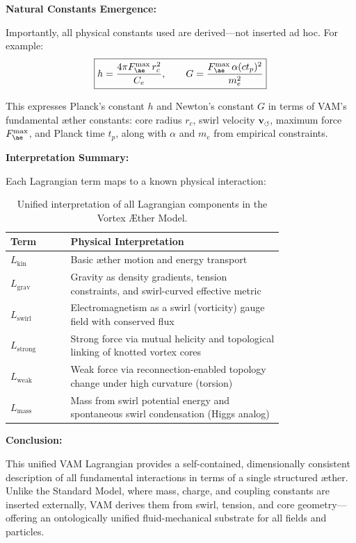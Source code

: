 \vspace{1em}
\noindent
\textbf{Natural Constants Emergence:}

Importantly, all physical constants used are derived—not inserted ad hoc. For example:
\[
\boxed{
h = \frac{4\pi F^{\max}_{\ae} \, r_c^2}{C_e}, \qquad
G = \frac{F^{\max}_{\ae} \, \alpha (ct_p)^2}{m_e^2}
}
\]

This expresses Planck’s constant \( h \) and Newton’s constant \( G \) in terms of VAM’s fundamental æther constants: core radius \( r_c \), swirl velocity \( \mathbf{v}_{\scriptscriptstyle\boldsymbol{\circlearrowleft}} \), maximum force \( F^{\max}_{\ae} \), and Planck time \( t_p \), along with \( \alpha \) and \( m_e \) from empirical constraints.

\vspace{1em}
\noindent
\textbf{Interpretation Summary:}

Each Lagrangian term maps to a known physical interaction:

\begin{table}[H]
\centering
\renewcommand{\arraystretch}{1.2}
\begin{tabular}{|l|p{0.78\linewidth}|}
\hline
\textbf{Term} & \textbf{Physical Interpretation} \\
\hline
\( L_{\text{kin}} \) & Basic æther motion and energy transport \\
\( L_{\text{grav}} \) & Gravity as density gradients, tension constraints, and swirl-curved effective metric \\
\( L_{\text{swirl}} \) & Electromagnetism as a swirl (vorticity) gauge field with conserved flux \\
\( L_{\text{strong}} \) & Strong force via mutual helicity and topological linking of knotted vortex cores \\
\( L_{\text{weak}} \) & Weak force via reconnection-enabled topology change under high curvature (torsion) \\
\( L_{\text{mass}} \) & Mass from swirl potential energy and spontaneous swirl condensation (Higgs analog) \\
\hline
\end{tabular}
\caption{Unified interpretation of all Lagrangian components in the Vortex Æther Model.}
\end{table}

\vspace{1em}
\noindent
\textbf{Conclusion:}

This unified VAM Lagrangian provides a self-contained, dimensionally consistent description of all fundamental interactions in terms of a single structured æther. Unlike the Standard Model, where mass, charge, and coupling constants are inserted externally, VAM derives them from swirl, tension, and core geometry—offering an ontologically unified fluid-mechanical substrate for all fields and particles.